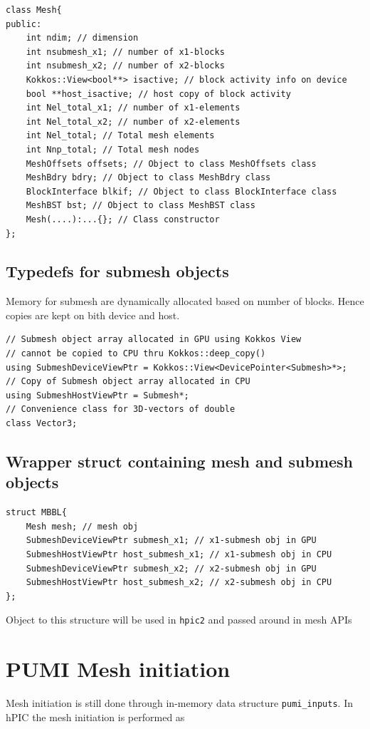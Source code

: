 \documentclass[a4paper,12pt]{article}
\begin{document}
\begin{lstlisting}
class Mesh{
public:
    int ndim; // dimension
    int nsubmesh_x1; // number of x1-blocks
    int nsubmesh_x2; // number of x2-blocks
    Kokkos::View<bool**> isactive; // block activity info on device
    bool **host_isactive; // host copy of block activity
    int Nel_total_x1; // number of x1-elements
    int Nel_total_x2; // number of x2-elements
    int Nel_total; // Total mesh elements
    int Nnp_total; // Total mesh nodes
    MeshOffsets offsets; // Object to class MeshOffsets class
    MeshBdry bdry; // Object to class MeshBdry class
    BlockInterface blkif; // Object to class BlockInterface class
    MeshBST bst; // Object to class MeshBST class   
    Mesh(....):...{}; // Class constructor
};
\end{lstlisting}

\subsection{Typedefs for submesh objects}
Memory for submesh are dynamically allocated based on number of blocks. Hence copies are kept on bith device and host.
\begin{lstlisting}
// Submesh object array allocated in GPU using Kokkos View
// cannot be copied to CPU thru Kokkos::deep_copy()
using SubmeshDeviceViewPtr = Kokkos::View<DevicePointer<Submesh>*>;
// Copy of Submesh object array allocated in CPU
using SubmeshHostViewPtr = Submesh*;
// Convenience class for 3D-vectors of double
class Vector3; 
\end{lstlisting}

\subsection{Wrapper struct containing mesh and submesh objects}
\begin{lstlisting}
struct MBBL{
    Mesh mesh; // mesh obj
    SubmeshDeviceViewPtr submesh_x1; // x1-submesh obj in GPU
    SubmeshHostViewPtr host_submesh_x1; // x1-submesh obj in CPU
    SubmeshDeviceViewPtr submesh_x2; // x2-submesh obj in GPU
    SubmeshHostViewPtr host_submesh_x2; // x2-submesh obj in CPU
};
\end{lstlisting}

Object to this structure will be used in \texttt{hpic2} and passed around in mesh APIs

\section{PUMI Mesh initiation}
Mesh initiation is still done through in-memory data structure \texttt{pumi\_inputs}. In hPIC the mesh initiation is performed as
\end{document}
